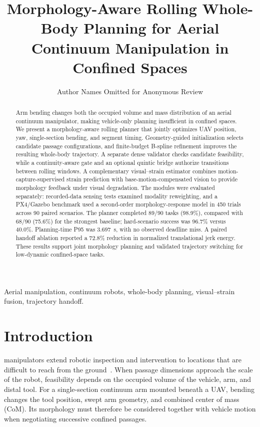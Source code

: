 \documentclass[journal,twoside]{IEEEtran}
\begin{document}
\title{Morphology-Aware Rolling Whole-Body Planning for Aerial Continuum Manipulation in Confined Spaces}
\author{Author Names Omitted for Anonymous Review}
\maketitle

\begin{abstract}
Arm bending changes both the occupied volume and mass distribution of an aerial continuum manipulator, making vehicle-only planning insufficient in confined spaces. We present a morphology-aware rolling planner that jointly optimizes UAV position, yaw, single-section bending, and segment timing. Geometry-guided initialization selects candidate passage configurations, and finite-budget B-spline refinement improves the resulting whole-body trajectory. A separate dense validator checks candidate feasibility, while a continuity-aware gate and an optional quintic bridge authorize transitions between rolling windows. A complementary visual--strain estimator combines motion-capture-supervised strain prediction with base-motion-compensated vision to provide morphology feedback under visual degradation. The modules were evaluated separately: recorded-data sensing tests examined modality reweighting, and a PX4/Gazebo benchmark used a second-order morphology-response model in 450 trials across 90 paired scenarios. The planner completed 89/90 tasks (98.9\%), compared with 68/90 (75.6\%) for the strongest baseline; hard-scenario success was 96.7\% versus 40.0\%. Planning-time P95 was 3.697~s, with no observed deadline miss. A paired handoff ablation reported a 72.8\% reduction in normalized translational jerk energy. These results support joint morphology planning and validated trajectory switching for low-dynamic confined-space tasks.
\end{abstract}
\begin{IEEEkeywords}
Aerial manipulation, continuum robots, whole-body planning, visual--strain fusion, trajectory handoff.
\end{IEEEkeywords}

\section{Introduction}\label{sec:intro}
 manipulators extend robotic inspection and intervention to locations that are difficult to reach from the ground~\cite{ollero2022survey}. When passage dimensions approach the scale of the robot, feasibility depends on the occupied volume of the vehicle, arm, and distal tool. For a single-section continuum arm mounted beneath a UAV, bending changes the tool position, swept arm geometry, and combined center of mass (CoM). Its morphology must therefore be considered together with vehicle motion when negotiating successive confined passages.
\end{document}
